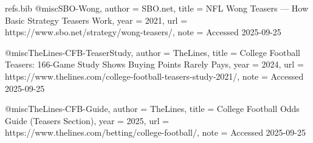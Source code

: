 \documentclass[11pt]{amsart}
\begin{document}
\begin{filecontents*}{refs.bib}
@misc{SBO-Wong,
  author = {{SBO.net}},
  title  = {NFL Wong Teasers --- How Basic Strategy Teasers Work},
  year   = {2021},
  url    = {https://www.sbo.net/strategy/wong-teasers/},
  note   = {Accessed 2025-09-25}
}

@misc{TheLines-CFB-TeaserStudy,
  author = {{TheLines}},
  title  = {College Football Teasers: 166-Game Study Shows Buying Points Rarely Pays},
  year   = {2024},
  url    = {https://www.thelines.com/college-football-teasers-study-2021/},
  note   = {Accessed 2025-09-25}
}

@misc{TheLines-CFB-Guide,
  author = {{TheLines}},
  title  = {College Football Odds Guide (Teasers Section)},
  year   = {2025},
  url    = {https://www.thelines.com/betting/college-football/},
  note   = {Accessed 2025-09-25}
}
\end{filecontents*}



\end{document}
